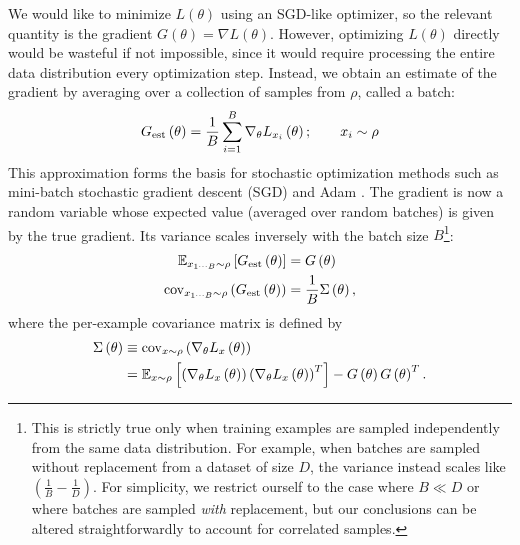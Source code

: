 \documentclass[english]{article}
\begin{document}
We would like to minimize $L\left(\theta\right)$ using an SGD-like optimizer, so the relevant quantity is the gradient $G\left(\theta\right)=\nabla L\left(\theta\right)$. However, optimizing $L\left(\theta\right)$ directly would be wasteful if not impossible, since it would require processing the entire data distribution every optimization step. Instead, we obtain an estimate of the gradient by averaging over a collection of samples from $\rho$, called a batch:
\begin{equation}
G_{{\rm est}}\left(\theta\right)=\frac{1}{B}\sum_{i=1}^{B}\nabla_{\theta}L_{x_{i}}\left(\theta\right);\qquad x_{i}\sim\rho
\end{equation}
This approximation forms the basis for stochastic optimization methods such as mini-batch stochastic gradient descent (SGD) and Adam \cite{kingma2014adam}. The gradient is now a random variable whose expected value (averaged over random batches) is given by the true gradient. Its variance scales inversely with the batch size $B$\footnote{This is strictly true only when training examples are sampled independently from the same data distribution. For example, when batches are sampled without replacement from a dataset of size $D$, the variance instead scales like $\left(\frac{1}{B}-\frac{1}{D}\right)$. For simplicity, we restrict ourself to the case where $B\ll D$ or where batches are sampled \emph{with} replacement, but our conclusions can be altered straightforwardly to account for correlated samples.}:
\begin{align}
\mathbb{E}_{x_{1\cdots B}\sim\rho}\left[G_{{\rm est}}\left(\theta\right)\right] & =G\left(\theta\right)\nonumber \\
{\rm cov}_{x_{1\cdots B}\sim\rho}\left(G_{{\rm est}}\left(\theta\right)\right) & =\frac{1}{B}\Sigma\left(\theta\right),\label{eq:gradient-estimate-variance}
\end{align}
where the per-example covariance matrix is defined by
\begin{align}
\Sigma\left(\theta\right) & \equiv{\rm cov}_{x\sim\rho}\left(\nabla_{\theta}L_{x}\left(\theta\right)\right)\nonumber \\
 & =\mathbb{E}_{x\sim\rho}\left[\left(\nabla_{\theta}L_{x}\left(\theta\right)\right)\left(\nabla_{\theta}L_{x}\left(\theta\right)\right)^{T}\right]-G\left(\theta\right)G\left(\theta\right)^{T}.\label{eq:per-sample-gradient-covariance}
\end{align}
\end{document}
